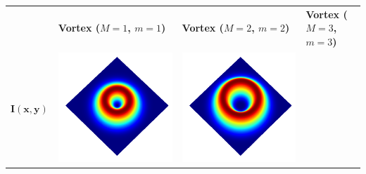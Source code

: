 \documentclass[a4paper, 12pt]{article}
\begin{document}
\begin{center}
\begin{tabular}{M{1.5cm}M{5cm}M{5cm}M{5cm}}
\ & \textbf{Vortex ($M=1$, $m=1$)} & \textbf{Vortex ($M=2$, $m=2$)} & \textbf{Vortex ($M=3$, $m=3$)} \tabularnewline
{}$\mathbf{I(x,y)}$ &
\includegraphics[width=\linewidth]{../resources/math_model/intensity_M=1.png} & 
\includegraphics[width=\linewidth]{../resources/math_model/intensity_M=2.png} & 

\end{tabular}
\end{center}
\end{document}
